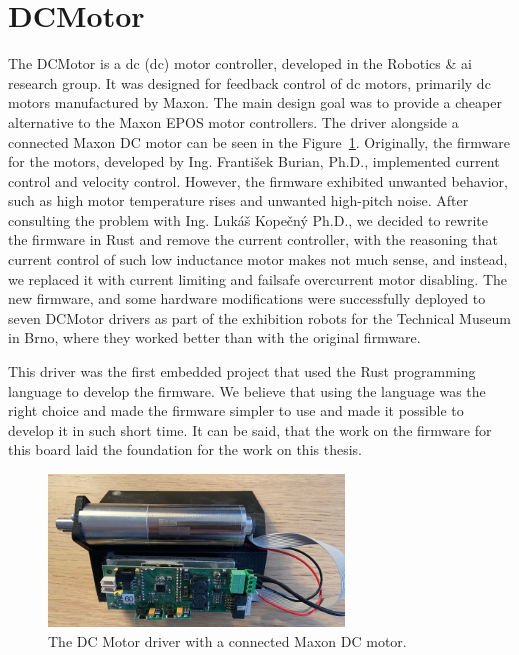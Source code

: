 \section{DCMotor}
\label{sec:dcmotor}
The DCMotor is a \acs{dc} (\acl{dc}) motor controller, developed in the Robotics \& \acs{ai} research group.
It was designed for feedback control of \acs{dc} motors, primarily \acs{dc} motors manufactured by Maxon.
The main design goal was to provide a cheaper alternative to the Maxon EPOS motor controllers.
The driver alongside a connected Maxon DC motor can be seen in the Figure~\ref{fig:dcmotor}.
Originally, the firmware for the motors, developed by Ing. František Burian, Ph.D., implemented current control and velocity control.
However, the firmware exhibited unwanted behavior, such as high motor temperature rises and unwanted high-pitch noise.
After consulting the problem with Ing. Lukáš Kopečný Ph.D., we decided to rewrite the firmware in Rust and remove the current controller, with the reasoning that current control of such low inductance motor makes not much sense, and instead, we replaced it with current limiting and failsafe overcurrent motor disabling.
The new firmware, and some hardware modifications were successfully deployed to seven DCMotor drivers as part of the exhibition robots for the Technical Museum in Brno, where they worked better than with the original firmware.

This driver was the first embedded project that used the Rust programming language to develop the firmware.
We believe that using the language was the right choice and made the firmware simpler to use and made it possible to develop it in such short time.
It can be said, that the work on the firmware for this board laid the foundation for the work on this thesis.

\begin{figure}[H]
    \centering
    \includegraphics[width=0.7\textwidth]{obrazky/dcmotor}
    \caption{The DC Motor driver with a connected Maxon DC motor.}
    \label{fig:dcmotor}
\end{figure}


